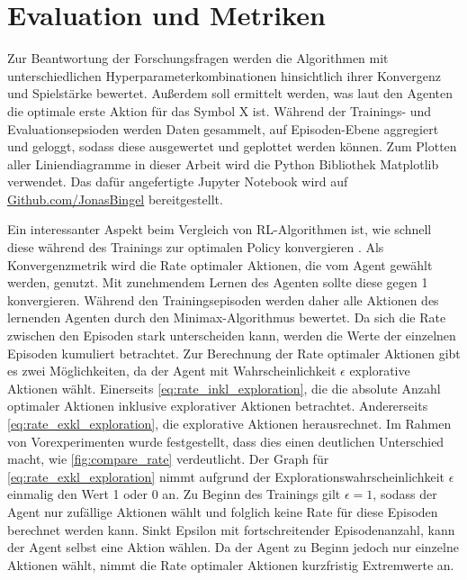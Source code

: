 \section{Evaluation und Metriken}
\label{sec:eval_metrik}
Zur Beantwortung der Forschungsfragen werden die Algorithmen mit unterschiedlichen Hyperparameterkombinationen hinsichtlich ihrer Konvergenz und Spielstärke bewertet. Außerdem soll ermittelt werden, was laut den Agenten die optimale erste Aktion für das Symbol X ist.
Während der Trainings- und Evaluationsepsioden werden Daten gesammelt, auf Episoden-Ebene aggregiert und geloggt, sodass diese ausgewertet und geplottet werden können. 
Zum Plotten aller Liniendiagramme in dieser Arbeit wird die Python Bibliothek Matplotlib \cite{hunterMatplotlib2DGraphics2007} verwendet. 
Das dafür angefertigte Jupyter Notebook wird auf \href{http://github.com/JonasBingel/ThesisHSMZ-RLTicTacToe-Jupyter}{Github.com/JonasBingel} bereitgestellt.

Ein interessanter Aspekt beim Vergleich von RL-Algorithmen ist, wie schnell diese während des Trainings zur optimalen Policy konvergieren \cite[S. 33]{suttonReinforcementLearningIntroduction2018}. 
Als Konvergenzmetrik wird die Rate optimaler Aktionen, die vom Agent gewählt werden, genutzt.
Mit zunehmendem Lernen des Agenten sollte diese gegen 1 konvergieren. 
Während den Trainingsepisoden werden daher alle Aktionen des lernenden Agenten durch den Minimax-Algorithmus bewertet. 
Da sich die Rate zwischen den Episoden stark unterscheiden kann, werden die Werte der einzelnen Episoden kumuliert betrachtet. 
Zur Berechnung der Rate optimaler Aktionen gibt es zwei Möglichkeiten, da der Agent mit Wahrscheinlichkeit $\epsilon$ explorative Aktionen wählt. 
Einerseits \cref{eq:rate_inkl_exploration}, die die absolute Anzahl optimaler Aktionen inklusive explorativer Aktionen betrachtet.
Andererseits \cref{eq:rate_exkl_exploration}, die explorative Aktionen herausrechnet. 
Im Rahmen von Vorexperimenten wurde festgestellt, dass dies einen deutlichen Unterschied macht, wie \cref{fig:compare_rate} verdeutlicht.
Der Graph für \cref{eq:rate_exkl_exploration} nimmt aufgrund der Explorationswahrscheinlichkeit $\epsilon$ einmalig den Wert 1 oder 0 an.
Zu Beginn des Trainings gilt $\epsilon = 1$, sodass der Agent nur zufällige Aktionen wählt und folglich keine Rate für diese Episoden berechnet werden kann. 
Sinkt Epsilon mit fortschreitender Episodenanzahl, kann der Agent selbst eine Aktion wählen. 
Da der Agent zu Beginn jedoch nur einzelne Aktionen wählt, nimmt die Rate optimaler Aktionen kurzfristig Extremwerte an.

